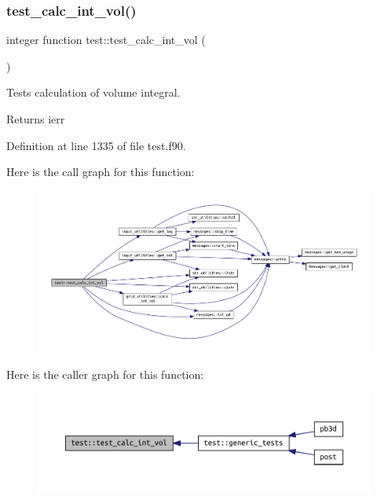\subsubsection{\texorpdfstring{test\+\_\+calc\+\_\+int\+\_\+vol()}{test\_calc\_int\_vol()}}
{\footnotesize\ttfamily integer function test\+::test\+\_\+calc\+\_\+int\+\_\+vol (\begin{DoxyParamCaption}{ }\end{DoxyParamCaption})}



Tests calculation of volume integral. 

\begin{DoxyReturn}{Returns}
ierr 
\end{DoxyReturn}


Definition at line 1335 of file test.\+f90.

Here is the call graph for this function\+:\nopagebreak
\begin{figure}[H]
\begin{center}
\leavevmode
\includegraphics[width=350pt]{namespacetest_a0d4cb791bf762b2e52260fea7644a3ee_cgraph}
\end{center}
\end{figure}
Here is the caller graph for this function\+:\nopagebreak
\begin{figure}[H]
\begin{center}
\leavevmode
\includegraphics[width=350pt]{namespacetest_a0d4cb791bf762b2e52260fea7644a3ee_icgraph}
\end{center}
\end{figure}
\mbox{\label{namespacetest_ac574f08ba400cd61070a6a6f13f6f7ee}} 
